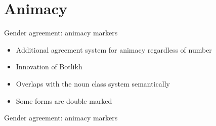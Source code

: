 \section{Animacy}
\begin{frame}{Gender agreement: animacy markers}

\begin{itemize}
    \item Additional agreement system for animacy regardless of number
    \item Innovation of Botlikh
    \item Overlaps with the noun class system semantically
    \item Some forms are double marked
\end{itemize}

\end{frame}

\begin{frame}{Gender agreement: animacy markers}




\end{frame}

